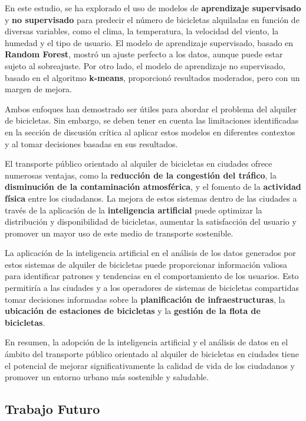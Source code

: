 \documentclass{wsdcr}
\begin{document}
En este estudio, se ha explorado el uso de modelos de \textbf{aprendizaje supervisado} y \textbf{no supervisado} para predecir el número de bicicletas alquiladas en función de diversas variables, como el clima, la temperatura, la velocidad del viento, la humedad y el tipo de usuario. El modelo de aprendizaje supervisado, basado en \textbf{Random Forest}, mostró un ajuste perfecto a los datos, aunque puede estar sujeto al sobreajuste. Por otro lado, el modelo de aprendizaje no supervisado, basado en el algoritmo \textbf{k-means}, proporcionó resultados moderados, pero con un margen de mejora.

Ambos enfoques han demostrado ser útiles para abordar el problema del alquiler de bicicletas. Sin embargo, se deben tener en cuenta las limitaciones identificadas en la sección de discusión crítica al aplicar estos modelos en diferentes contextos y al tomar decisiones basadas en sus resultados.

El transporte público orientado al alquiler de bicicletas en ciudades ofrece numerosas ventajas, como la \textbf{reducción de la congestión del tráfico}, la \textbf{disminución de la contaminación atmosférica}, y el fomento de la \textbf{actividad física} entre los ciudadanos. La mejora de estos sistemas dentro de las ciudades a través de la aplicación de la \textbf{inteligencia artificial} puede optimizar la distribución y disponibilidad de bicicletas, aumentar la satisfacción del usuario y promover un mayor uso de este medio de transporte sostenible.

La aplicación de la inteligencia artificial en el análisis de los datos generados por estos sistemas de alquiler de bicicletas puede proporcionar información valiosa para identificar patrones y tendencias en el comportamiento de los usuarios. Esto permitiría a las ciudades y a los operadores de sistemas de bicicletas compartidas tomar decisiones informadas sobre la \textbf{planificación de infraestructuras}, la \textbf{ubicación de estaciones de bicicletas} y la \textbf{gestión de la flota de bicicletas}.

En resumen, la adopción de la inteligencia artificial y el análisis de datos en el ámbito del transporte público orientado al alquiler de bicicletas en ciudades tiene el potencial de mejorar significativamente la calidad de vida de los ciudadanos y promover un entorno urbano más sostenible y saludable.
\subsection{Trabajo Futuro}
\end{document}
